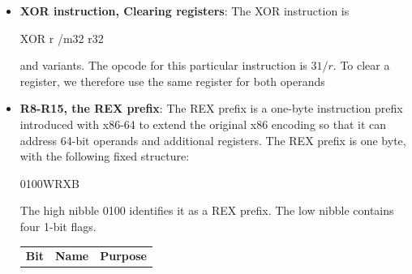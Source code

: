 \documentclass{report}
\begin{document}
\begin{itemize}
            \bigbreak \noindent 
            Before we can proceed with the division, we must extend the sign bit of the accumulator into the DX register. For this, we need CWD, CDQ, CQO instructions. CWD converts a word to a double word, and CDQ converts a double word to a quadword. In particular, the version of these instructions that extend the sign bit of AX into DX are given by opcode 99, and they take no operands. Thus,
            \bigbreak \noindent 
            \begin{cppcode}
            CDQ
            \end{cppcode}
            \bigbreak \noindent 
            Extends the sign bit of EAX (32-bit doubleword) into EDX, thus converting to a quadword (64-bit). This operation must be done before division.
            \bigbreak \noindent 
            Note that the encoding for CDQ is 99, and the encoding for IDIV is f7 /7, where the instruction is
            \bigbreak \noindent 
            \begin{cppcode}
            IDIV   r/m32
            \end{cppcode}
        \item \textbf{XOR instruction, Clearing registers}: The XOR instruction is
            \bigbreak \noindent 
            \begin{cppcode}
            XOR   r /m32 r32 
            \end{cppcode}
            \bigbreak \noindent 
            and variants. The opcode for this particular instruction is $31 /r$. To clear a register, we therefore use the same register for both operands 
            \bigbreak \noindent 
        \item \textbf{R8-R15, the REX prefix}: The REX prefix is a one-byte instruction prefix introduced with x86-64 to extend the original x86 encoding so that it can address 64-bit operands and additional registers. 
            \bigbreak \noindent 
            The REX prefix is one byte, with the following fixed structure:
            \bigbreak \noindent 
            \begin{cppcode}
            0100WRXB
            \end{cppcode}
            \bigbreak \noindent 
            The high nibble 0100 identifies it as a REX prefix. The low nibble contains four 1-bit flags.
            \begin{center}
                \begin{tabularx}{\textwidth}{@{}XXX@{}}
                    \toprule
                    \textbf{Bit}&	\textbf{Name}&	\textbf{Purpose} \\

\end{tabularx}
\end{center}
\end{itemize}
\end{document}
